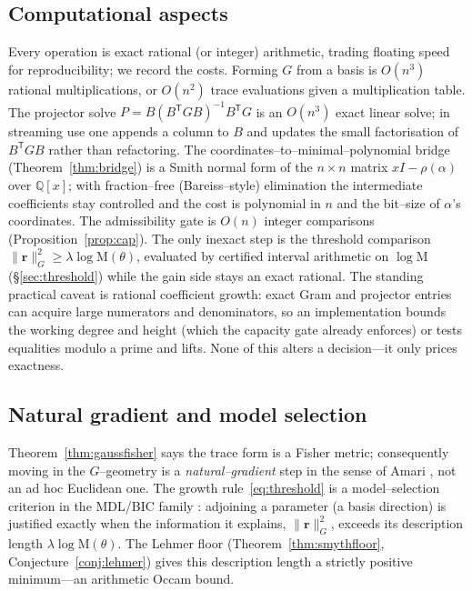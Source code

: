 \documentclass[11pt]{article}
\theoremstyle{plain}
\theoremstyle{definition}
\theoremstyle{remark}
\newcommand{\Q}{\mathbb{Q}}
\newcommand{\Mah}{\mathrm{M}}
\newcommand{\rr}{\mathbf{r}}
\newcommand{\GG}{G}
\newcommand{\BB}{B}
\newcommand{\transpose}{^{\mathsf{T}}}
\newcommand{\inv}{^{-1}}
\begin{document}
\subsection{Computational aspects}\label{subsec:complexity}
Every operation is exact rational (or integer) arithmetic, trading floating speed for reproducibility; we
record the costs. Forming $\GG$ from a basis is $O(n^3)$ rational multiplications, or $O(n^2)$ trace
evaluations given a multiplication table. The projector solve
$P=\BB(\BB\transpose\GG\BB)\inv\BB\transpose\GG$ is an $O(n^3)$ exact linear solve; in streaming use one
appends a column to $\BB$ and updates the small factorisation of $\BB\transpose\GG\BB$ rather than
refactoring. The coordinates--to--minimal--polynomial bridge (Theorem~\ref{thm:bridge}) is a Smith normal
form of the $n\times n$ matrix $xI-\rho(\alpha)$ over $\Q[x]$; with fraction--free (Bareiss--style)
elimination the intermediate coefficients stay controlled and the cost is polynomial in $n$ and the bit--size
of $\alpha$'s coordinates. The admissibility gate is $O(n)$ integer comparisons
(Proposition~\ref{prop:cap}). The only inexact step is the threshold comparison
$\lVert\rr\rVert_{\GG}^2\ge\lambda\log\Mah(\theta)$, evaluated by certified interval arithmetic on
$\log\Mah$ (\S\ref{sec:threshold}) while the gain side stays an exact rational. The standing practical caveat
is rational coefficient growth: exact Gram and projector entries can acquire large numerators and
denominators, so an implementation bounds the working degree and height (which the capacity gate already
enforces) or tests equalities modulo a prime and lifts. None of this alters a decision---it only prices
exactness.

\subsection{Natural gradient and model selection}
Theorem~\ref{thm:gaussfisher} says the trace form is a Fisher metric; consequently moving in the
$\GG$--geometry is a \emph{natural--gradient} step in the sense of Amari \cite{Amari,AmariNagaoka}, not an
ad hoc Euclidean one. The growth rule~\eqref{eq:threshold} is a model--selection criterion in the MDL/BIC
family \cite{Rissanen,Schwarz}: adjoining a parameter (a basis direction) is justified exactly when the
information it explains, $\lVert\rr\rVert_{\GG}^2$, exceeds its description length $\lambda\log\Mah(\theta)$.
The Lehmer floor (Theorem~\ref{thm:smythfloor}, Conjecture~\ref{conj:lehmer}) gives this description length a
strictly positive minimum---an arithmetic Occam bound.
\end{document}
